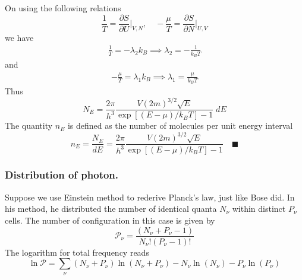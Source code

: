 \documentclass[../../../Main.tex]{subfiles}
\begin{document}
On using the following relations
\begin{equation*}
    \frac{1}{T}=\frac{\partial S}{\partial U}\bigg|_{V,N},\quad -\frac{\mu}{T}=\frac{\partial S}{\partial N}\bigg|_{U,V}
\end{equation*}
we have 
\begin{align*}
    \frac{1}{T}=-\lambda_2k_B\implies
    \lambda_2=-\frac{1}{k_BT}
\end{align*}
and
\begin{align*}
    -\frac{\mu}{T}=\lambda_1k_B\implies
    \lambda_1=\frac{\mu}{k_BT}
\end{align*}
Thus
\begin{equation*}
    N_E=\frac{2\pi}{h^3} \frac{V (2m)^{3/2}\sqrt{E}}{\exp\left[(E-\mu)/k_BT\right]-1} \;dE
\end{equation*}
The quantity $n_E$ is defined as the number of molecules per unit energy interval
\begin{equation*}
    n_E=\frac{N_E}{dE}=\frac{2\pi}{h^3} \frac{V (2m)^{3/2}\sqrt{E}}{\exp\left[(E-\mu)/k_BT\right]-1} \quad\blacksquare
\end{equation*}

\subsubsection*{Distribution of photon.} Suppose we use Einstein method to rederive Planck's law, just like Bose did. In his method, he distributed the number of identical quanta $N_\nu$ within distinct $P_\nu$ cells. The number of configuration in this case is given by 
\begin{equation*}
    \mathcal{P}_\nu=\frac{(N_\nu+P_\nu-1)}{N_\nu! (P_\nu-1)!}
\end{equation*}
The logarithm for total frequency reads
\begin{equation*}
    \ln \mathcal{P}=\sum_\nu (N_\nu+P_\nu)\ln (N_\nu+P_\nu)-N_\nu\ln(N_\nu)- P_\nu \ln (P_\nu)
\end{equation*}
\end{document}
